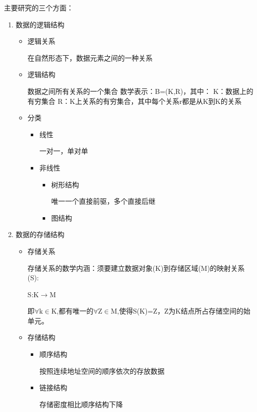 \documentclass[AutoFakeBold]{LZUThesis2007}
\begin{document}
	主要研究的三个方面：
\begin{enumerate}
	\item 数据的逻辑结构
		\begin{itemize}
		\item  逻辑关系
	
					在自然形态下，数据元素之间的一种关系
	
		\item  逻辑结构
	
					数据之间所有关系的一个集合
				数学表示：B=(K,R)，其中：
				K：数据上的有穷集合
				R：K上关系的有穷集合，其中每个关系r都是从K到K的关系
	
		\item  分类
	
			\begin{itemize}
				\item  线性
						
							一对一，单对单
		
				\item  非线性
				\begin{itemize}
					\item  树形结构
		
								唯一一个直接前驱，多个直接后继
		
					\item  图结构
				\end{itemize}
			\end{itemize}
		\end{itemize}

	\item 数据的存储结构
			\begin{itemize}
				\item  存储关系
	
							存储关系的数学内涵：须要建立数据对象(K)到存储区域(M)的映射关系(S):

							S:K$\rightarrow$M

							即$\forall \mathrm{k} \in \mathrm{K}$,都有唯一的$\forall \mathrm{Z} \in \mathrm{M}$,使得S(K)=Z，Z为K结点所占存储空间的始单元。

	
				\item  存储结构
					\begin{itemize}
						\item  顺序结构
			
									按照连续地址空间的顺序依次的存放数据
			
						\item  链接结构

									存储密度相比顺序结构下降


\end{itemize}
\end{itemize}
\end{enumerate}
\end{document}
